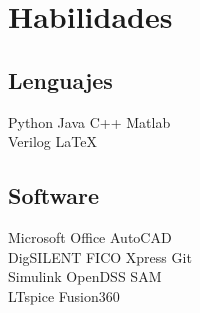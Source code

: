 \section{Habilidades \faCode}
\subsection{Lenguajes}
Python \textbullet{} Java \textbullet{} C++ \textbullet{}
Matlab \\ Verilog \textbullet{} \LaTeX
\sectionsep
\subsection{Software}
Microsoft Office \textbullet{} AutoCAD \\ 
DigSILENT \textbullet{} FICO Xpress \textbullet{} Git \\ 
Simulink \textbullet{} OpenDSS \textbullet{} SAM  \\
LTspice \textbullet{} Fusion360
\sectionsep
